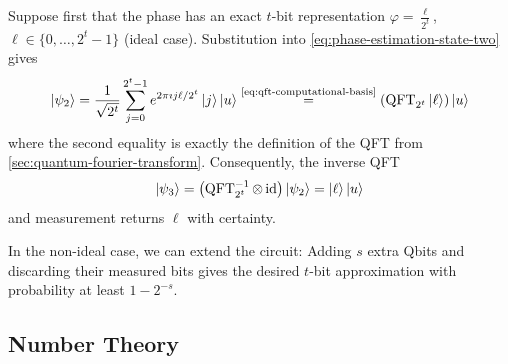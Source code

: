 Suppose first that the phase has an exact \(t\)-bit representation
\(
\varphi
=
\frac{\ell}{2^t}
\), \(
\ell\in\{0,\ldots,2^t-1\}
\) (ideal case).
Substitution into \autoref{eq:phase-estimation-state-two} gives
\begin{equation}\label{eq:phase-estimation-fourier-state}
\ket{\psi_2}
=
\frac{1}{\sqrt{2^t}}
\sum_{j=0}^{2^t-1}
e^{2\pi\imath j\ell/2^t}
\ket j\ket u
\overset{\text{\eqref{eq:qft-computational-basis}}}{=}
\left(
\operatorname{QFT}_{2^t}\ket\ell
\right)
\ket u
\end{equation}
where the second equality is exactly the definition of the QFT from
\autoref{sec:quantum-fourier-transform}.
Consequently, the inverse QFT 
\begin{equation}\label{eq:phase-estimation-state-three}
\ket{\psi_3}
=
\left(
\operatorname{QFT}_{2^t}^{-1}\otimes\operatorname{id}
\right)
\ket{\psi_2}
=
\ket\ell\ket u
\end{equation}
and measurement returns \(\ell\) with certainty.


In the non-ideal case, we can extend the circuit:
Adding \(s\) extra Qbits and discarding their measured bits gives the desired \(t\)-bit approximation with probability at least
\(
1-2^{-s}
\).









\subsection{Number Theory}

